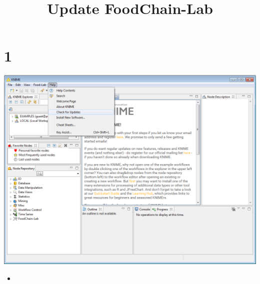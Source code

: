 \documentclass{beamer}
\title{Update FoodChain-Lab}
\date{}
\begin{document}
\maketitle
 
\section{1}
\begin{frame}
	\begin{center}
  		\includegraphics[height=0.6\textheight]{1.png}
	\end{center}
	\begin{itemize}
		\item
	\end{itemize}
\end{frame}
\end{document}
